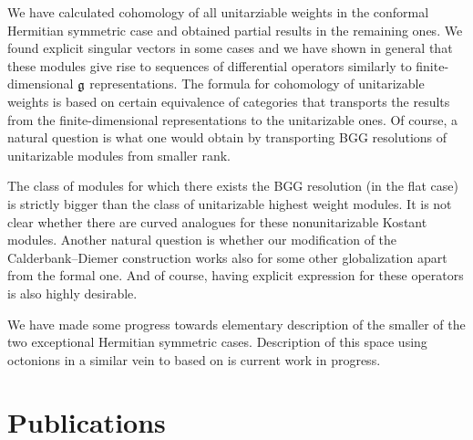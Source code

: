\documentclass[12pt,a4paper,final]{report}
\begin{document}
We have calculated cohomology of all unitarziable weights in the conformal Hermitian symmetric case and obtained partial results in the remaining ones. We found explicit singular vectors in some cases and we have shown in general that these modules give rise to sequences of differential operators similarly to finite-dimensional $\mathfrak{g}$ representations. The formula for cohomology of unitarizable weights is based on certain equivalence of categories that transports the results from the finite-dimensional representations to the unitarizable ones. Of course, a natural question is what one would obtain by transporting BGG resolutions of unitarizable modules from smaller rank.

The class of modules for which there exists the BGG resolution (in the flat case) is strictly bigger than the class of unitarizable highest weight modules. It is not clear whether there are curved analogues for these nonunitarizable Kostant modules. Another natural question is whether our modification of the Calderbank--Diemer construction works also for some other globalization apart from the formal one. And of course, having explicit expression for these operators is also highly desirable. 

We have made some progress towards elementary description of the smaller of the two exceptional Hermitian symmetric cases. Description of this space using octonions in a similar vein to \cite{pazourek_hyperplane_2011} based on \cite{baez_division_2010} is current work in progress. 

\printbibliography

\chapter*{Publications}


\bigskip

\noindent{}

\bigskip

\noindent{}
\end{document}
